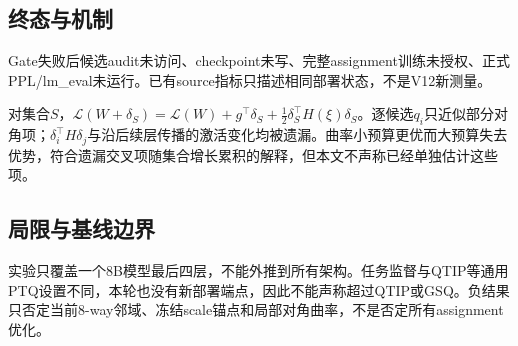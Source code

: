 \subsection{终态与机制}

Gate失败后候选audit未访问、checkpoint未写、完整assignment训练未授权、正式PPL/lm\_eval未运行。已有source指标只描述相同部署状态，不是V12新测量。

对集合$S$，$\mathcal L(W+\delta_S)=\mathcal L(W)+g^\top\delta_S+\frac12\delta_S^\top H(\xi)\delta_S$。逐候选$q_i$只近似部分对角项；$\delta_i^\top H\delta_j$与沿后续层传播的激活变化均被遗漏。曲率小预算更优而大预算失去优势，符合遗漏交叉项随集合增长累积的解释，但本文不声称已经单独估计这些项。

\subsection{局限与基线边界}

实验只覆盖一个8B模型最后四层，不能外推到所有架构。任务监督与QTIP等通用PTQ设置不同，本轮也没有新部署端点，因此不能声称超过QTIP或GSQ。负结果只否定当前8-way邻域、冻结scale锚点和局部对角曲率，不是否定所有assignment优化。
